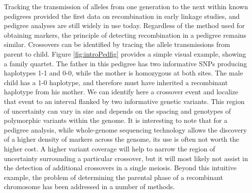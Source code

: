 Tracking the transmission of alleles from one generation to the next within known pedigrees provided the first data on recombination in early linkage studies, and pedigree analyses are still widely in use today.
Regardless of the method used for obtaining markers, the principle of detecting recombination in a pedigree remains similar.
Crossovers can be identified by tracing the allele transmissions from parent to child.
Figure \ref{fig:introPedfig} provides a simple visual example, showing a family quartet.
The father in this pedigree has two informative SNPs producing haplotypes 1-1 and 0-0, while the mother is homozygous at both sites.
The male child has a 1-0 haplotype, and therefore must have inherited a recombinant haplotype from his mother.
We can identify here a crossover event and localize that event to an interval flanked by two informative genetic variants.
This region of uncertainty can vary in size and depends on the spacing and genotypes of polymorphic variants within the genome.
It is interesting to note that for a pedigree analysis, 
while whole-genome sequencing technology allows the discovery of a higher density of markers across the genome, its use is often not worth the higher cost.
A higher variant coverage will help to narrow the region of uncertainty surrounding a particular crossover, but it will most likely not assist in the detection of additional crossovers in a single meiosis.
Beyond this intuitive example, the problem of determining the parental phase of a recombinant chromosome has been addressed in a number of methods.
%
